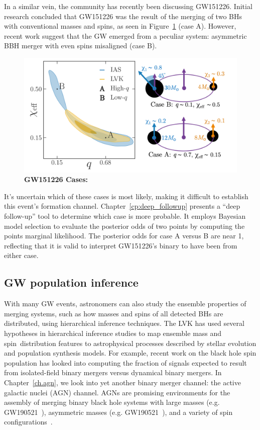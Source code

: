 In a similar vein, the community has recently been discussing GW151226. 
Initial research concluded that GW151226 was the result of the merging of two BHs with conventional masses and spins, as seen in Figure~\ref{fig:gw151226_cases} (case A).
However, recent work suggest that the GW emerged from a peculiar system: asymmetric BBH merger with even spins misaligned (case B).

\begin{figure}
\begin{center}
  \centerline{\includegraphics[width=1.1\linewidth]{src/figures/gw151226_cases.png}}
  \caption{\textbf{GW151226 Cases:}  }
  \label{fig:gw151226_cases}
\end{center}
\end{figure}

It's uncertain which of these cases is most likely, making it difficult to establish this event's formation channel.
Chapter~\ref{cp:deep_followup} presents a ``deep follow-up'' tool to determine which case is  more probable.
It employs Bayesian model selection to evaluate the posterior odds of two points by computing the points marginal likelihood.
The posterior odds for case A versus B are near 1, reflecting that it is valid to interpret GW151226's binary to have been from either case.

\subsection{GW population inference}

With many GW events, astronomers can also study the ensemble properties of merging systems, such as how masses and spins of all detected BHs are distributed, using hierarchical inference techniques.
The LVK has used several hypotheses in hierarchical inference studies to map ensemble mass and spin distribution features to astrophysical processes  described by stellar evolution and population synthesis models.
For example, recent work on the black hole spin population has looked into computing the fraction of signals expected to result from isolated-field binary mergers versus dynamical binary mergers.
In Chapter~\ref{ch.agn}, we look into yet another binary merger channel: the active galactic nuclei (AGN) channel.
AGNs are promising environments for the assembly of merging binary black hole systems with large masses (e.g. GW190521~\cite{gw190521_agn}), asymmetric masses (e.g. GW190521~\cite{gw190425_agn}), and a variety of spin configurations~\cite{agn_spin_population_models}. 

